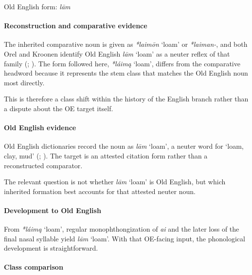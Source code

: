\documentclass[
  british,
  a4paper,
]{article}
\providecommand{\Recon}[1]{\emph{*#1}}
\begin{document}
Old English form: \emph{lām}

\paragraph{Reconstruction and comparative
evidence}\label{reconstruction-and-comparative-evidence-103}

The inherited comparative noun is given as \Recon{laimōn} `loam' or
\emph{*laiman-}, and both Orel and Kroonen identify Old English
\emph{lām} `loam' as a neuter reflex of that family
(;
). The form followed here,
\Recon{láimą} `loam', differs from the comparative headword because it
represents the stem class that matches the Old English noun most
directly.

This is therefore a class shift within the history of the English branch
rather than a dispute about the OE target itself.

\paragraph{Old English evidence}\label{old-english-evidence-105}

Old English dictionaries record the noun as \emph{lām} `loam', a neuter
word for `loam, clay, mud' (; ). The target is an attested citation form rather than a
reconstructed comparator.

The relevant question is not whether \emph{lām} `loam' is Old English,
but which inherited formation best accounts for that attested neuter
noun.

\paragraph{Development to Old
English}\label{development-to-old-english-103}

From \Recon{láimą} `loam', regular monophthongization of \emph{ai} and
the later loss of the final nasal syllable yield \emph{lām} `loam'. With
that OE-facing input, the phonological development is straightforward.

\paragraph{Class comparison}\label{class-comparison-3}
\end{document}
